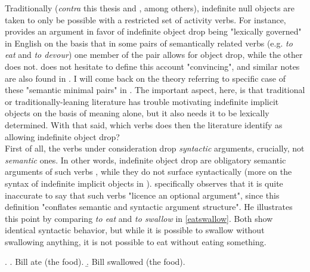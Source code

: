 Traditionally (\textit{contra} this thesis and \textcite[55]{TonelliDelmonte2011}, among others), indefinite null objects are taken to only be possible with a restricted set of activity verbs. For instance, \textcite[510]{Rizzi1986} provides an argument in favor of indefinite object drop being "lexically governed" in English on the basis that in some pairs of semantically related verbs (e.g. \textit{to eat} and \textit{to devour}) one member of the pair allows for object drop, while the other does not. \textcite[236]{Haegeman1987} does not hesitate to define this account "convincing", and similar notes are also found in \textcite{Fillmore1986, Rice1988, Mittwoch2005, Gillon2012}. I will come back on the theory referring to specific case of these "semantic minimal pairs" in . The important aspect, here, is that traditional or traditionally-leaning literature has trouble motivating indefinite implicit objects on the basis of meaning alone, but it also needs it to be lexically determined. With that said, which verbs does then the literature identify as allowing indefinite object drop?\\
First of all, the verbs under consideration drop \textit{syntactic} arguments, crucially, not \textit{semantic} ones. In other words, indefinite object drop are obligatory semantic arguments of such verbs \parencite[120]{Cote1996}, while they do not surface syntactically (more on the syntax of indefinite implicit objects in ). \textcite[134]{Jackendoff2003} specifically observes that it is quite inaccurate to say that such verbs "licence an optional argument", since this definition "conflates semantic and syntactic argument structure". He illustrates this point by comparing \textit{to eat} and \textit{to swallow} in \ref{eatswallow}. Both show identical syntactic behavior, but while it is possible to swallow without swallowing anything, it is not possible to eat without eating something.

\ex. \label{eatswallow} \a. \label{eatswallow1} Bill ate (the food).
\b. \label{eatswallow2} Bill swallowed (the food).

